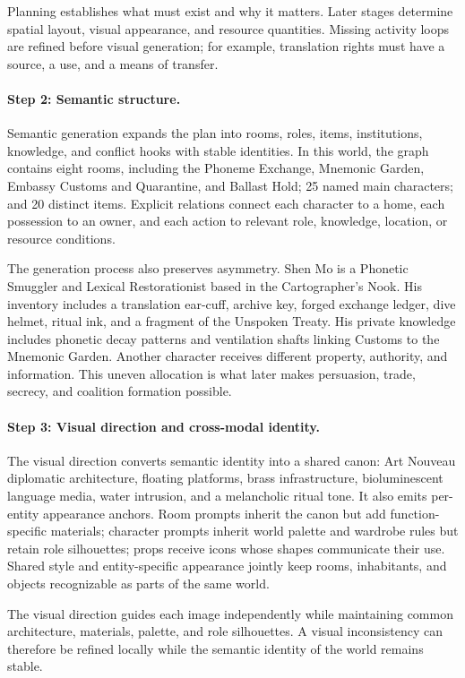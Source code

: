 \documentclass[10pt,twocolumn]{article}
\begin{document}
Planning establishes what must exist and why it matters. Later stages determine
spatial layout, visual appearance, and resource quantities. Missing activity
loops are refined before visual generation; for example, translation rights
must have a source, a use, and a means of transfer.

\paragraph{Step 2: Semantic structure.}
Semantic generation expands the plan into rooms, roles, items, institutions,
knowledge, and conflict hooks with stable identities. In this world,
the graph contains eight rooms, including the Phoneme Exchange, Mnemonic
Garden, Embassy Customs and Quarantine, and Ballast Hold; 25 named main
characters; and 20 distinct items. Explicit relations connect each character to
a home, each possession to an owner, and each action to relevant role,
knowledge, location, or resource conditions.

The generation process also preserves asymmetry. Shen Mo is a Phonetic
Smuggler and Lexical Restorationist based in the Cartographer's Nook. His
inventory includes a translation ear-cuff, archive key, forged exchange ledger,
dive helmet, ritual ink, and a fragment of the Unspoken Treaty. His private
knowledge includes phonetic decay patterns and ventilation shafts linking
Customs to the Mnemonic Garden. Another character receives different property,
authority, and information. This uneven allocation is what later makes
persuasion, trade, secrecy, and coalition formation possible.

\paragraph{Step 3: Visual direction and cross-modal identity.}
The visual direction converts semantic identity into a shared canon:
Art Nouveau diplomatic architecture, floating platforms, brass infrastructure,
bioluminescent language media, water intrusion, and a melancholic ritual tone.
It also emits per-entity appearance anchors. Room prompts inherit the canon but
add function-specific materials; character prompts inherit world palette and
wardrobe rules but retain role silhouettes; props receive icons whose shapes
communicate their use. Shared style and entity-specific appearance jointly keep
rooms, inhabitants, and objects recognizable as parts of the same world.

The visual direction guides each image independently while maintaining common
architecture, materials, palette, and role silhouettes. A visual inconsistency
can therefore be refined locally while the semantic identity of the world
remains stable.
\end{document}
